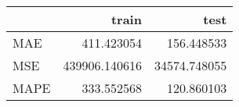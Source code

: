 \begin{tabular}{lrr}
\toprule
{} &          train &          test \\
\midrule
MAE  &     411.423054 &    156.448533 \\
MSE  &  439906.140616 &  34574.748055 \\
MAPE &     333.552568 &    120.860103 \\
\bottomrule
\end{tabular}
